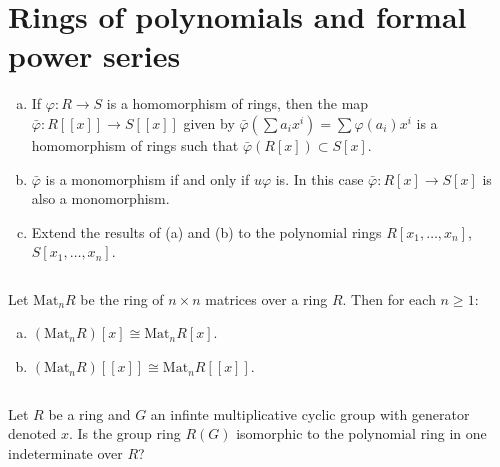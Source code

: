 \section{Rings of polynomials and formal power series}
\begin{ex}
    \begin{enumerate}[(a)]
        \item If $\varphi:R\to S$ is a homomorphism of rings, then the map $\bar{\varphi}:R[[x]]\to S[[x]]$ given by $\bar{\varphi}(\sum a_{i}x^{i})=\sum \varphi(a_{i})x^{i}$ is a homomorphism of rings such that $\bar{\varphi}(R[x])\subset S[x]$.
        \item $\bar{\varphi}$ is a monomorphism if and only if $u\varphi$ is. In this case $\bar{\varphi}:R[x]\to S[x]$ is also a monomorphism.
        \item Extend the results of (a) and (b) to the polynomial rings $R[x_{1},\dots, x_{n}]$, $S[x_{1},\dots,x_{n}]$.
    \end{enumerate}
\end{ex}

$$ $$

\begin{ex}
    Let $\mathrm{Mat}_{n}R$ be the ring of $n\times n$ matrices over a ring $R$. Then for each $n\geq 1$:
    \begin{enumerate}[(a)]
        \item $(\mathrm{Mat}_{n}R)[x]\cong \mathrm{Mat}_{n}R[x]$.
        \item $(\mathrm{Mat}_{n}R)[[x]]\cong \mathrm{Mat}_{n}R[[x]]$.
    \end{enumerate}
\end{ex}

$$ $$

\begin{ex}
    Let $R$ be a ring and $G$ an infinte multiplicative cyclic group with generator denoted $x$. Is the group ring $R(G)$ isomorphic to the polynomial ring in one indeterminate over $R$?
\end{ex}

$$ $$

